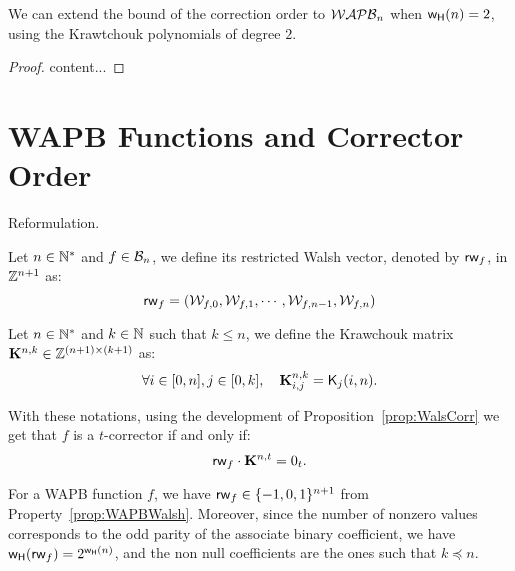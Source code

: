 \documentclass[11pt]{llncs}
\begin{document}
We can extend the bound of the correction order to $\mathcal{WAPB}_{n}$ when $\mathsf{w_H}(n)=2$, using the Krawtchouk polynomials of degree $2$.

\begin{proposition}
\end{proposition}
\begin{proof}
	content...
\end{proof}






\section{WAPB Functions and Corrector Order}


Reformulation.

\begin{definition}\label{def:restWalshVect}
Let $n\in \mathbb{N}^*$ and $f\in \mathcal{B}_n$, we define its restricted Walsh vector, denoted by $\mathsf{rw}_{f}$, in $\mathbb{Z}^{n+1}$ as:
\[\mathsf{rw}_{f}=(\mathcal{W}_{f,0},\mathcal{W}_{f,1},\cdots,\mathcal{W}_{f,n-1},\mathcal{W}_{f,n})\]

\end{definition}


\begin{definition}\label{def:KrMat}
	Let $n\in \mathbb{N}^*$ and $k\in \mathbb{N}$ such that $k\le n$, we define the Krawchouk matrix
	$\mathbf{K}^{n,k}\in 	\mathbb{Z}^{(n+1)\times (k+1)}$ as:
	\[\forall i \in [0,n], j\in [0,k], \quad \mathbf{K}^{n,k}_{i,j}=\mathsf{K}_{j}(i,n).\]

\end{definition}

With these notations, using the development of Proposition~\ref{prop:WalsCorr} we get that $f$ is a $t$-corrector if and only if:
\[\mathsf{rw}_{f} \cdot \mathbf{K}^{n,t}=0_t.\]

For a WAPB function $f$, we have $\mathsf{rw}_{f}\in \{-1,0,1\}^{n+1}$ from Property~\ref{prop:WAPBWalsh}. Moreover, since the number of nonzero values corresponds to the odd parity of the associate binary coefficient, we have $\mathsf{w_H}(\mathsf{rw}_{f})=2^{\mathsf{w_H}(n)}$, and the non null coefficients are the ones such that $k\preceq n$.
\end{document}
